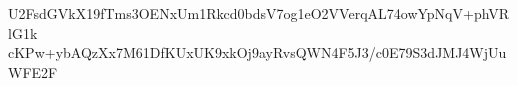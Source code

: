 U2FsdGVkX19fTms3OENxUm1Rkcd0bdsV7og1eO2VVerqAL74owYpNqV+phVRlG1k
cKPw+ybAQzXx7M61DfKUxUK9xkOj9ayRvsQWN4F5J3/c0E79S3dJMJ4WjUuWFE2F

